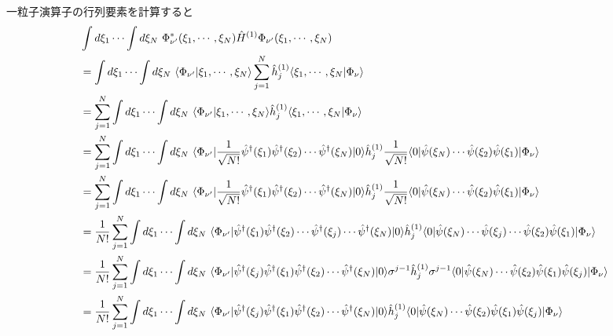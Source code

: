 \documentclass[dvipdfmx, 11pt, a4paper]{jsarticle}
\numberwithin{equation}{section}
\theoremstyle{definition}
\begin{document}
    \begin{derivationBox}
        一粒子演算子の行列要素を計算すると
        \begin{align}
            &\int d\xi_1 \cdots \int d\xi_N\ \Phi_{\nu'}^*(\xi_1, \cdots,\xi_N) \hat{H}^{(1)} \Phi_{\nu'}(\xi_1, \cdots,\xi_N) \notag \\
            &= \int d\xi_1 \cdots \int d\xi_N\ \langle \Phi_{\nu'}|\xi_1, \cdots,\xi_N \rangle \sum_{j=1}^N \hat{h}_j^{(1)} \langle \xi_1, \cdots,\xi_N| \Phi_\nu \rangle \notag \\
            &= \sum_{j=1}^N \int d\xi_1 \cdots \int d\xi_N\ \langle \Phi_{\nu'}|\xi_1, \cdots,\xi_N \rangle \hat{h}_j^{(1)} \langle \xi_1, \cdots,\xi_N| \Phi_\nu \rangle \notag \\
            &= \sum_{j=1}^N \int d\xi_1 \cdots \int d\xi_N\ \langle \Phi_{\nu'}| \frac{1}{\sqrt{N!}} \hat{\psi}^\dagger (\xi_1) \hat{\psi}^\dagger (\xi_2)\cdots \hat{\psi}^\dagger (\xi_N) |0\rangle  \hat{h}_j^{(1)} \frac{1}{\sqrt{N!}} \langle 0| \hat{\psi}(\xi_N)\cdots \hat{\psi}(\xi_2)\hat{\psi}(\xi_1) | \Phi_\nu \rangle \notag \\
            &= \sum_{j=1}^N \int d\xi_1 \cdots \int d\xi_N\ \langle \Phi_{\nu'}| \frac{1}{\sqrt{N!}} \hat{\psi}^\dagger (\xi_1) \hat{\psi}^\dagger (\xi_2)\cdots \hat{\psi}^\dagger (\xi_N) |0\rangle  \hat{h}_j^{(1)} \frac{1}{\sqrt{N!}} \langle 0| \hat{\psi}(\xi_N)\cdots \hat{\psi}(\xi_2)\hat{\psi}(\xi_1) | \Phi_\nu \rangle \notag \\
            &= \frac{1}{N!}\sum_{j=1}^N \int d\xi_1 \cdots \int d\xi_N\ \langle \Phi_{\nu'}| \hat{\psi}^\dagger (\xi_1) \hat{\psi}^\dagger (\xi_2)\cdots \hat{\psi}^\dagger (\xi_j) \cdots \hat{\psi}^\dagger (\xi_N) |0\rangle  \hat{h}_j^{(1)} \langle 0| \hat{\psi}(\xi_N)\cdots \hat{\psi}(\xi_j) \cdots \hat{\psi}(\xi_2)\hat{\psi}(\xi_1)  |\Phi_\nu \rangle \notag \\
            &= \frac{1}{N!}\sum_{j=1}^N \int d\xi_1 \cdots \int d\xi_N\ \langle \Phi_{\nu'}| \hat{\psi}^\dagger(\xi_j) \hat{\psi}^\dagger (\xi_1) \hat{\psi}^\dagger (\xi_2)\cdots \hat{\psi}^\dagger (\xi_N) |0\rangle \sigma^{j-1} \hat{h}_j^{(1)} \sigma^{j-1} \langle 0| \hat{\psi}(\xi_N)\cdots \hat{\psi}(\xi_2)\hat{\psi}(\xi_1) \hat{\psi}(\xi_j) |\Phi_\nu \rangle \notag \\
            &= \frac{1}{N!}\sum_{j=1}^N \int d\xi_1 \cdots \int d\xi_N\ \langle \Phi_{\nu'}| \hat{\psi}^\dagger(\xi_j) \hat{\psi}^\dagger (\xi_1) \hat{\psi}^\dagger (\xi_2)\cdots \hat{\psi}^\dagger (\xi_N) |0\rangle \hat{h}_j^{(1)} \langle 0| \hat{\psi}(\xi_N)\cdots \hat{\psi}(\xi_2)\hat{\psi}(\xi_1) \hat{\psi}(\xi_j) |\Phi_\nu \rangle \notag \\

\end{align}
\end{derivationBox}
\end{document}
